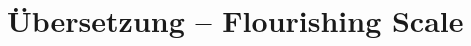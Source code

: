 %
%
\glsresetall

\let\raggedsection\centering 
\chapter{Übersetzung -- Flourishing Scale}\label{chap.appendix_fs}
\let\raggedsection\raggedright 
